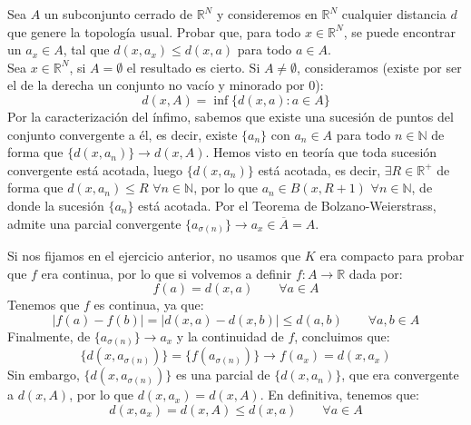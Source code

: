 \begin{ejercicio}
Sea \( A \) un subconjunto cerrado de \( \mathbb{R}^N \) y consideremos en \( \mathbb{R}^N \) cualquier distancia \( d \) que genere la topología usual. Probar que, para todo \( x \in \mathbb{R}^N \), se puede encontrar un \( a_x \in A \), tal que \( d(x, a_x) \leq d(x, a) \) para todo \( a \in A \).\\

\noindent
Sea $x\in \mathbb{R}^N$, si $A = \emptyset $ el resultado es cierto. Si $A\neq \emptyset $, consideramos (existe por ser el de la derecha un conjunto no vacío y minorado por 0):
\begin{equation*}
    d(x,A) = \inf \{d(x,a):a\in A\}
\end{equation*}
Por la caracterización del ínfimo, sabemos que existe una sucesión de puntos del conjunto convergente a él, es decir, existe $\{a_n\}$ con $a_n \in A$ para todo $n\in \mathbb{N}$ de forma que $\{d(x,a_n)\} \rightarrow d(x,A)$. Hemos visto en teoría que toda sucesión convergente está acotada, luego $\{d(x,a_n)\}$ está acotada, es decir, $\exists R\in \mathbb{R}^+$ de forma que $d(x,a_n)\leq R$ $\forall n\in \mathbb{N}$, por lo que $a_n \in B(x,R+1)$ $\forall n\in \mathbb{N}$, de donde la sucesión $\{a_n\}$ está acotada. Por el Teorema de Bolzano-Weierstrass, admite una parcial convergente $\{a_{\sigma(n)}\} \rightarrow a_x \in \overline{A} = A$.

Si nos fijamos en el ejercicio anterior, no usamos que $K$ era compacto para probar que $f$ era continua, por lo que si volvemos a definir $f:A\rightarrow \mathbb{R}$ dada por:
\begin{equation*}
    f(a) = d(x,a) \qquad \forall a\in A
\end{equation*}
Tenemos que $f$ es continua, ya que:
\begin{equation*}
    |f(a) - f(b)| = |d(x,a) - d(x,b)| \leq d(a,b) \qquad \forall a,b\in A
\end{equation*}
Finalmente, de $\{a_{\sigma(n)}\} \rightarrow a_x$ y la continuidad de $f$, concluimos que:
\begin{equation*}
    \{d(x,a_{\sigma(n)})\} = \{f(a_{\sigma(n)})\} \rightarrow f(a_x) = d(x,a_x)
\end{equation*}
Sin embargo, $\{d(x,a_{\sigma(n)})\}$ es una parcial de $\{d(x,a_n)\}$, que era convergente a $d(x,A)$, por lo que $d(x,a_x) = d(x,A)$. En definitiva, tenemos que:
\begin{equation*}
    d(x,a_x) = d(x,A) \leq d(x,a) \qquad \forall a\in A
\end{equation*}
\end{ejercicio}

